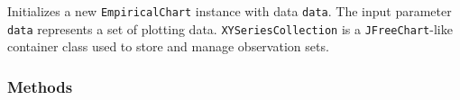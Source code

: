 \begin{tabb}
   Initializes a new \texttt{EmpiricalChart} instance with data \texttt{data}.
   The input parameter \texttt{data} represents a set of plotting data.
   \texttt{XYSeriesCollection} is a \texttt{JFreeChart}-like container class
    used to store and manage observation sets.
\end{tabb}
\begin{htmlonly}
\end{htmlonly}


\subsubsection*{Methods}

